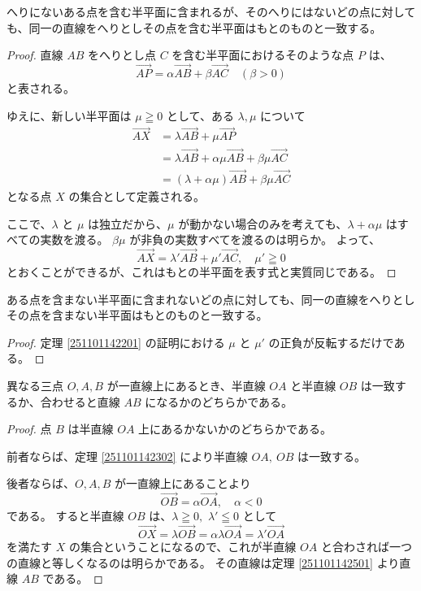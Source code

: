 \begin{thm}\label{251101142201}
  へりにないある点を含む半平面に含まれるが、そのへりにはないどの点に対しても、同一の直線をへりとしその点を含む半平面はもとのものと一致する。
\end{thm}

\begin{proof}
  直線 \(AB\) をへりとし点 \(C\) を含む半平面におけるそのような点 \(P\) は、
  \[\overrightarrow{AP}=\alpha\overrightarrow{AB}+\beta\overrightarrow{AC} \quad (\beta>0)\]
  と表される。

  ゆえに、新しい半平面は \(\mu\geqq0\) として、ある \(\lambda,\mu\) について
  \begin{align*}
    \overrightarrow{AX} &= \lambda\overrightarrow{AB}+\mu\overrightarrow{AP} \\
                        &= \lambda\overrightarrow{AB}+\alpha\mu\overrightarrow{AB}+\beta\mu\overrightarrow{AC} \\
                        &= (\lambda+\alpha\mu)\overrightarrow{AB}+\beta\mu\overrightarrow{AC}
  \end{align*}
  となる点 \(X\) の集合として定義される。

  ここで、\(\lambda\) と \(\mu\) は独立だから、\(\mu\) が動かない場合のみを考えても、\(\lambda+\alpha\mu\) はすべての実数を渡る。
  \(\beta\mu\) が非負の実数すべてを渡るのは明らか。
  よって、
  \[\overrightarrow{AX}=\lambda'\overrightarrow{AB}+\mu'\overrightarrow{AC},\quad \mu'\geqq0\]
  とおくことができるが、これはもとの半平面を表す式と実質同じである。
\end{proof}

\begin{thm}
  ある点を含まない半平面に含まれないどの点に対しても、同一の直線をへりとしその点を含まない半平面はもとのものと一致する。
\end{thm}

\begin{proof}
  定理 \ref{251101142201} の証明における \(\mu\) と \(\mu'\) の正負が反転するだけである。
\end{proof}

\begin{thm}
  異なる三点 \(O,A,B\) が一直線上にあるとき、半直線 \(OA\) と半直線 \(OB\) は一致するか、合わせると直線 \(AB\) になるかのどちらかである。
\end{thm}

\begin{proof}
  点 \(B\) は半直線 \(OA\) 上にあるかないかのどちらかである。

  前者ならば、定理 \ref{251101142302} により半直線 \(OA,\:OB\) は一致する。

  後者ならば、\(O,A,B\) が一直線上にあることより
  \[\overrightarrow{OB}=\alpha\overrightarrow{OA},\quad \alpha<0\]
  である。
  すると半直線 \(OB\) は、\(\lambda\geqq0,\) \(\lambda'\leqq0\) として
  \[\overrightarrow{OX}=\lambda\overrightarrow{OB}=\alpha\lambda\overrightarrow{OA}=\lambda'\overrightarrow{OA}\]
  を満たす \(X\) の集合ということになるので、これが半直線 \(OA\) と合わされば一つの直線と等しくなるのは明らかである。
  その直線は定理 \ref{251101142501} より直線 \(AB\) である。
\end{proof}

